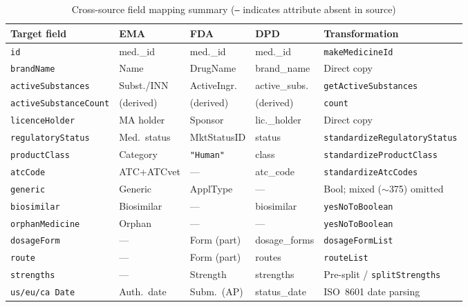 \documentclass{llncs}
\begin{document}
\begin{table}[htbp]
\centering
\caption{Cross-source field mapping summary (\texttt{---} indicates attribute absent in source)}
\label{tab:field_mappings}
\scriptsize
\setlength{\tabcolsep}{1.2pt}
\begin{tabularx}{\textwidth}{|l|l|l|l|>{\raggedright\arraybackslash}X|}
\hline
\textbf{Target field} & \textbf{EMA} & \textbf{FDA} & \textbf{DPD} & \textbf{Transformation} \\
\hline
\texttt{id}                   & med.\_id     & med.\_id     & med.\_id     & \texttt{makeMedicineId} \\
\texttt{brandName}            & Name         & DrugName     & brand\_name  & Direct copy \\
\texttt{activeSubstances}     & Subst./INN   & ActiveIngr.  & active\_subs. & \texttt{getActiveSubstances} \\
\texttt{activeSubstanceCount} & (derived)    & (derived)    & (derived)    & \texttt{count} \\
\texttt{licenceHolder}        & MA holder    & Sponsor      & lic.\_holder & Direct copy \\
\texttt{regulatoryStatus}     & Med.\ status & MktStatusID  & status       & \texttt{standardizeRegulatoryStatus} \\
\texttt{productClass}         & Category     & \texttt{"Human"} & class    & \texttt{standardizeProductClass} \\
\texttt{atcCode}              & ATC+ATCvet   & ---          & atc\_code    & \texttt{standardizeAtcCodes} \\
\texttt{generic}              & Generic      & ApplType     & ---          & Bool; mixed ($\sim$375) omitted \\
\texttt{biosimilar}           & Biosimilar   & ---          & biosimilar   & \texttt{yesNoToBoolean} \\
\texttt{orphanMedicine}       & Orphan       & ---          & ---          & \texttt{yesNoToBoolean} \\
\texttt{dosageForm}           & ---          & Form (part)  & dosage\_forms & \texttt{dosageFormList} \\
\texttt{route}                & ---          & Form (part)  & routes       & \texttt{routeList} \\
\texttt{strengths}            & ---          & Strength     & strengths    & Pre-split / \texttt{splitStrengths} \\
\texttt{us/eu/ca Date}        & Auth.\ date  & Subm.\ (AP)  & status\_date & ISO~8601 date parsing \\
\hline
\end{tabularx}
\end{table}
\end{document}
